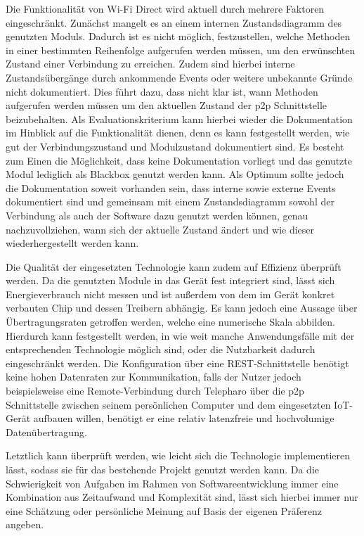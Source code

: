 \documentclass[12pt,a4paper]{article}
\begin{document}
        Die Funktionalität von Wi-Fi Direct wird aktuell durch mehrere Faktoren eingeschränkt. Zunächst mangelt es an einem internen Zustandsdiagramm des genutzten Moduls. Dadurch ist es nicht möglich, festzustellen, welche Methoden in einer bestimmten Reihenfolge aufgerufen werden müssen, um den erwünschten Zustand einer Verbindung zu erreichen. Zudem sind hierbei interne Zustandsübergänge durch ankommende Events oder weitere unbekannte Gründe nicht dokumentiert. Dies führt dazu, dass nicht klar ist, wann Methoden aufgerufen werden müssen um den aktuellen Zustand der p2p Schnittstelle beizubehalten.
        Als Evaluationskriterium kann hierbei wieder die Dokumentation im Hinblick auf die Funktionalität dienen, denn es kann festgestellt werden, wie gut der Verbindungszustand und Modulzustand dokumentiert sind. Es besteht zum Einen die Möglichkeit, dass keine Dokumentation vorliegt und das genutzte Modul lediglich als Blackbox genutzt werden kann. Als Optimum sollte jedoch die Dokumentation soweit vorhanden sein, dass interne sowie externe Events dokumentiert sind und gemeinsam mit einem Zustandsdiagramm sowohl der Verbindung als auch der Software dazu genutzt werden können, genau nachzuvollziehen, wann sich der aktuelle Zustand ändert und wie dieser wiederhergestellt werden kann.
        
        Die Qualität der eingesetzten Technologie kann zudem auf Effizienz überprüft werden. Da die genutzten Module in das Gerät fest integriert sind, lässt sich Energieverbrauch nicht messen und ist außerdem von dem im Gerät konkret verbauten Chip und dessen Treibern abhängig. Es kann jedoch eine Aussage über Übertragungsraten getroffen werden, welche eine numerische Skala abbilden. Hierdurch kann festgestellt werden, in wie weit manche Anwendungsfälle mit der entsprechenden Technologie möglich sind, oder die Nutzbarkeit dadurch eingeschränkt werden. Die Konfiguration über eine REST-Schnittstelle benötigt keine hohen Datenraten zur Kommunikation, falls der Nutzer jedoch beispielsweise eine Remote-Verbindung durch Telepharo über die p2p Schnittstelle zwischen seinem persönlichen Computer und dem eingesetzten IoT-Gerät aufbauen willen, benötigt er eine relativ latenzfreie und hochvolumige Datenübertragung.
        
        Letztlich kann überprüft werden, wie leicht sich die Technologie implementieren lässt, sodass sie für das bestehende Projekt genutzt werden kann. Da die Schwierigkeit von Aufgaben im Rahmen von Softwareentwicklung immer eine Kombination aus Zeitaufwand und Komplexität sind, lässt sich hierbei immer nur eine Schätzung oder persönliche Meinung auf Basis der eigenen Präferenz angeben.
\end{document}
